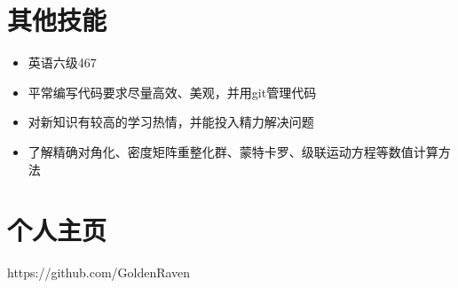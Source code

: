 \documentclass{resume}
\begin{document}
\section{其他技能}
\begin{itemize}%
\item 英语六级467
\item 平常编写代码要求尽量高效、美观，并用git管理代码
\item 对新知识有较高的学习热情，并能投入精力解决问题
\item 了解精确对角化、密度矩阵重整化群、蒙特卡罗、级联运动方程等数值计算方法
\end{itemize}

\section{个人主页}
\rm{https://github.com/GoldenRaven}


%  
\end{document}
